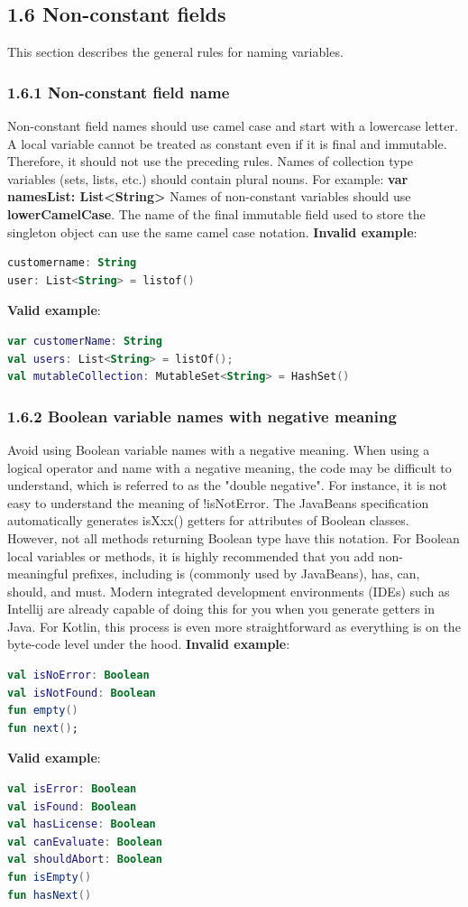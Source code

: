 \subsection*{\textbf{1.6 Non-constant fields}}
\label{sec:1.6}
This section describes the general rules for naming variables.
\subsubsection*{\textbf{1.6.1 Non-constant field name}}
\leavevmode\newline
\label{sec:1.6.1}
Non-constant field names should use camel case and start with a lowercase letter.
A local variable cannot be treated as constant even if it is final and immutable. Therefore, it should not use the preceding rules. Names of collection type variables (sets, lists, etc.) should contain plural nouns.
For example: \textbf{var namesList: List<String>}
Names of non-constant variables should use \textbf{lowerCamelCase}. The name of the final immutable field used to store the singleton object can use the same camel case notation.
\textbf{Invalid example}: 
\begin{lstlisting}[language=Kotlin]
customername: String
user: List<String> = listof()
\end{lstlisting}
\textbf{Valid example}: 
\begin{lstlisting}[language=Kotlin]
var customerName: String
val users: List<String> = listOf();
val mutableCollection: MutableSet<String> = HashSet()
\end{lstlisting}
\subsubsection*{\textbf{1.6.2 Boolean variable names with negative meaning}}
\leavevmode\newline
\label{sec:1.6.2}
Avoid using Boolean variable names with a negative meaning. When using a logical operator and name with a negative meaning, the code may be difficult to understand, which is referred to as the "double negative".
For instance, it is not easy to understand the meaning of !isNotError.
The JavaBeans specification automatically generates isXxx() getters for attributes of Boolean classes.
However, not all methods returning Boolean type have this notation.
For Boolean local variables or methods, it is highly recommended that you add non-meaningful prefixes, including is (commonly used by JavaBeans), has, can, should, and must. Modern integrated development environments (IDEs) such as Intellij are already capable of doing this for you when you generate getters in Java. For Kotlin, this process is even more straightforward as everything is on the byte-code level under the hood.
\textbf{Invalid example}: 
\begin{lstlisting}[language=Kotlin]
val isNoError: Boolean
val isNotFound: Boolean
fun empty()
fun next();
\end{lstlisting}
\textbf{Valid example}:
\begin{lstlisting}[language=Kotlin]
val isError: Boolean
val isFound: Boolean
val hasLicense: Boolean
val canEvaluate: Boolean
val shouldAbort: Boolean
fun isEmpty()
fun hasNext()
\end{lstlisting}
